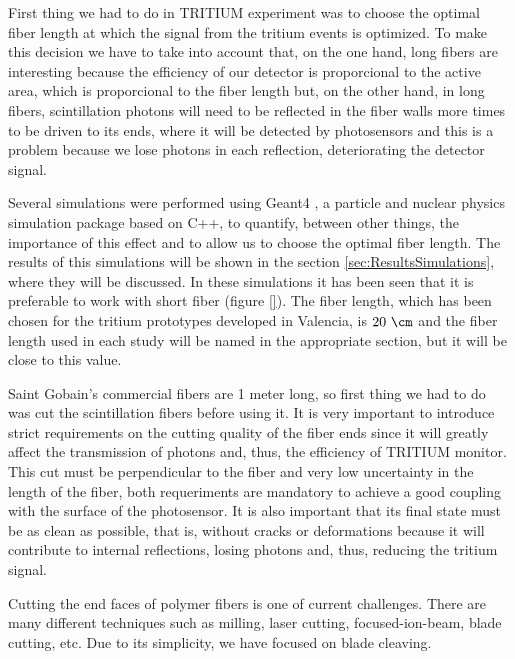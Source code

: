 First thing we had to do in TRITIUM experiment was to choose the optimal fiber length at which the signal from the tritium events is optimized. To make this decision we have to take into account that, on the one hand, long fibers are interesting because the efficiency of our detector is proporcional to the active area, which is proporcional to the fiber length but, on the other hand, in long fibers, scintillation photons will need to be reflected in the fiber walls more times to be driven to its ends, where it will be detected by photosensors and this is a problem because we lose photons in each reflection, deteriorating the detector signal.

Several simulations were performed using Geant4 \cite{Geant4WebPage}, a particle and nuclear physics simulation package based on C++, to quantify, between other things, the importance of this effect and to allow us to choose the optimal fiber length. The results of this simulations will be shown in the section \ref{sec:ResultsSimulations}, where they will be discussed. In these simulations it has been seen that it is preferable to work with short fiber (figure \ref{}). The fiber length, which has been chosen for the tritium prototypes developed in Valencia, is $20~\cm$ and the fiber length used in each study will be named in the appropriate section, but it will be close to this value.

Saint Gobain's commercial fibers are 1 meter long, so first thing we had to do was cut the scintillation fibers before using it. It is very important to introduce strict requirements on the cutting quality of the fiber ends since it will greatly affect the transmission of photons and, thus, the efficiency of TRITIUM monitor. This cut must be perpendicular to the fiber and very low uncertainty in the length of the fiber, both requeriments are mandatory to achieve a good coupling with the surface of the photosensor. It is also important that its final state must be as clean as possible, that is, without cracks or deformations because it will contribute to internal reflections, losing photons and, thus, reducing the tritium signal.

Cutting the end faces of polymer fibers is one of current challenges. There are many different techniques such as milling, laser cutting, focused-ion-beam, blade cutting, etc. Due to its simplicity, we have focused on blade cleaving. %

